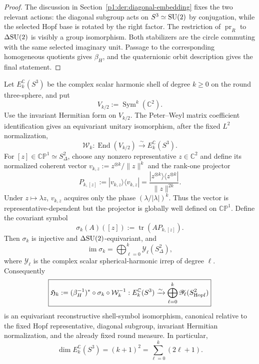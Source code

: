 \documentclass[11pt]{article}
\begin{document}
\begin{proof}
The discussion in Section~\ref{p1:der:diagonal-embedding} fixes the two
relevant actions: the diagonal subgroup acts on \(S^3\simeq\mathrm{SU}(2)\) by
conjugation, while the selected Hopf base is rotated by the right factor.
The restriction of \(\operatorname{pr}_R\) to \(\Delta\mathrm{SU}(2)\) is visibly a
group isomorphism.  Both stabilizers are the circle commuting with the same
selected imaginary unit.  Passage to the corresponding homogeneous quotients
gives \(\beta_H\), and the quaternionic orbit description gives the final
statement.
\end{proof}

\begin{theorem}
\label{p1:thm:hopf-marked-diagonal-shell-symbol}
Let \(E_k^{\mathbb C}(S^3)\) be the complex scalar harmonic shell of degree
\(k\ge0\) on the round three-sphere, and put
\[
 V_{k/2}:=\operatorname{Sym}^k(\mathbb C^2).
\]
Use the invariant Hermitian form on \(V_{k/2}\).  The Peter--Weyl matrix
coefficient identification gives an equivariant unitary isomorphism, after
the fixed \(L^2\) normalization,
\[
 \mathcal W_k:\operatorname{End}(V_{k/2})
 \xrightarrow{\sim} E_k^{\mathbb C}(S^3).
\]
For \([z]\in\mathbb{CP}^1\simeq S^2_\Delta\), choose any nonzero
representative \(z\in\mathbb C^2\) and define its normalized coherent
vector \(v_{k,z}:=z^{\otimes k}/\|z\|^k\) and the rank-one projector
\[
 P_{k,[z]}:=|v_{k,z}\rangle\langle v_{k,z}|
 =\frac{|z^{\otimes k}\rangle\langle z^{\otimes k}|}{\|z\|^{2k}}.
\]
Under \(z\mapsto\lambda z\), \(v_{k,z}\) acquires only the phase
\((\lambda/|\lambda|)^k\).  Thus the vector is representative-dependent
but the projector is globally well defined on \(\mathbb{CP}^1\).
Define the covariant symbol
\[
 \sigma_k(A)([z]):=\operatorname{tr}(A P_{k,[z]}).
\]
Then \(\sigma_k\) is injective and \(\Delta\mathrm{SU}(2)\)-equivariant, and
\[
 \operatorname{im}\sigma_k
 =\bigoplus_{\ell=0}^{k}\mathscr Y_\ell(S^2_\Delta),
\]
where \(\mathscr Y_\ell\) is the complex scalar spherical-harmonic irrep of
degree \(\ell\).  Consequently
\[
 \boxed{\mathfrak H_k
 :=(\beta_H^{-1})^*\circ\sigma_k\circ\mathcal W_k^{-1}:
 E_k^{\mathbb C}(S^3)
 \xrightarrow{\sim}
 \bigoplus_{\ell=0}^{k}\mathscr Y_\ell(S^2_{\rm Hopf})}
\]
is an equivariant reconstructive shell-symbol isomorphism, canonical relative
to the fixed Hopf representative, diagonal subgroup, invariant Hermitian
normalization, and the already fixed round measure.  In particular,
\[
 \boxed{\dim E_k^{\mathbb C}(S^3)
 =(k+1)^2
 =\sum_{\ell=0}^{k}(2\ell+1).}
\]
\end{theorem}
\end{document}
